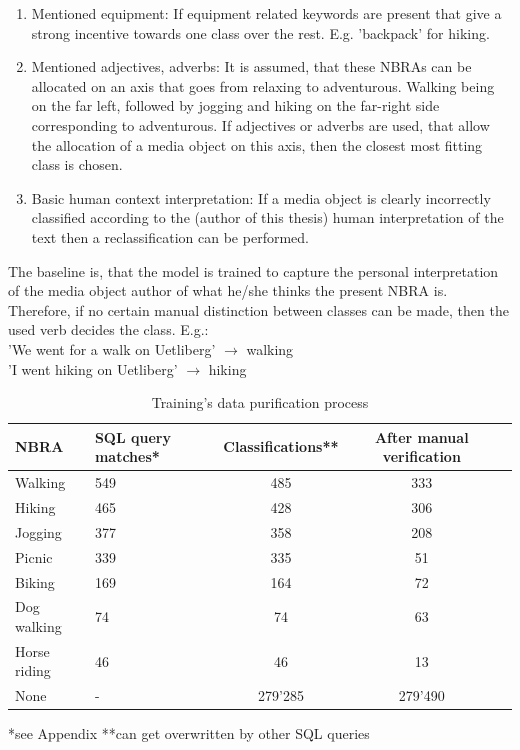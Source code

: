 \begin{enumerate}
    \item Mentioned equipment: If equipment related keywords are present that give a strong incentive towards one class over the rest. E.g. 'backpack' for hiking.
    \item Mentioned adjectives, adverbs: It is assumed, that these NBRAs can be allocated on an axis that goes from relaxing to adventurous. Walking being on the far left, followed by jogging and hiking on the far-right side corresponding to adventurous. If adjectives or adverbs are used, that allow the allocation of a media object on this axis, then the closest most fitting class is chosen.
    \item Basic human context interpretation: If a media object is clearly incorrectly classified according to the (author of this thesis) human interpretation of the text then a reclassification can be performed.
\end{enumerate}

The baseline is, that the model is trained to capture the personal interpretation of the media object author of what he/she thinks the present NBRA is. Therefore, if no certain manual distinction between classes can be made, then the used verb decides the class. E.g.:\\
'We went for a walk on Uetliberg' $\to$ walking \\
'I went hiking on Uetliberg' $\to$ hiking\\

\begin{table}[ht]
\begin{center}
\caption{Training's data purification process}\vspace{1ex}
\label{tab:trainingsdata}
\begin{tabular}{llccc}\hline
NBRA & SQL query matches* & Classifications** & After manual verification \\ \hline
Walking & 549 & 485 & 333 \\
Hiking & 465 & 428 & 306 \\
Jogging & 377 & 358 & 208 \\
Picnic & 339 & 335 & 51 \\
Biking & 169 & 164 & 72 \\
Dog walking & 74 & 74 & 63 \\
Horse riding & 46 & 46 & 13 \\
None & - & 279'285 & 279'490 \\ \hline
\end{tabular}
\newline
*see Appendix **can get overwritten by other SQL queries
\end{center}
\end{table}

